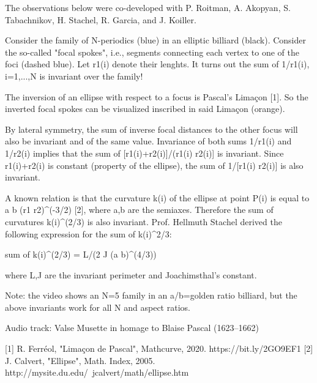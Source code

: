 The observations below were co-developed with P. Roitman, A. Akopyan, S. Tabachnikov, H. Stachel, R. Garcia, and J. Koiller.

Consider the family of N-periodics (blue) in an elliptic billiard (black). Consider the so-called "focal spokes", i.e., segments connecting each vertex to one of the foci (dashed blue). Let r1(i) denote their lenghts. It turns out the sum of 1/r1(i), i=1,...,N is invariant over the family! 

The inversion of an ellipse with respect to a focus is Pascal's Limaçon [1]. So the inverted focal spokes can be visualized inscribed in said Limaçon (orange).

By lateral symmetry, the sum of inverse focal distances to the other focus will also be invariant and of the same value. Invariance of both sums 1/r1(i) and 1/r2(i) implies that the sum of [r1(i)+r2(i)]/(r1(i) r2(i)] is invariant. Since r1(i)+r2(i) is constant (property of the ellipse), the sum of 1/[r1(i) r2(i)] is also invariant. 

A known relation is that the curvature k(i) of the ellipse at point P(i) is equal to a b (r1 r2)^(-3/2) [2], where a,b are the semiaxes. Therefore the sum of curvatures k(i)^(2/3) is also invariant. Prof. Hellmuth Stachel derived the following expression for the sum of k(i)^2/3:

sum of k(i)^(2/3) = L/(2 J (a b)^(4/3))

where L,J are the invariant perimeter and Joachimsthal's constant.

Note: the video shows an N=5 family in an a/b=golden ratio billiard, but the above invariants work for all N and aspect ratios.

Audio track: Valse Musette in homage to Blaise Pascal (1623–1662)

[1] R. Ferréol, "Limaçon de Pascal", Mathcurve, 2020. https://bit.ly/2GO9EF1
[2] J. Calvert, "Ellipse", Math. Index, 2005. http://mysite.du.edu/~jcalvert/math/ellipse.htm